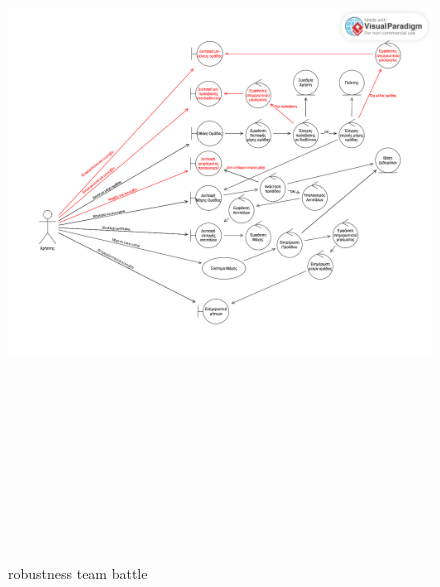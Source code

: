 \begin{figure}[!htb]
  \centering
    \centering
    \includegraphics[width=20cm,height=20cm]{robust_teambattle.png}
    \caption{robustness team battle}
    \label{}
\end{figure}